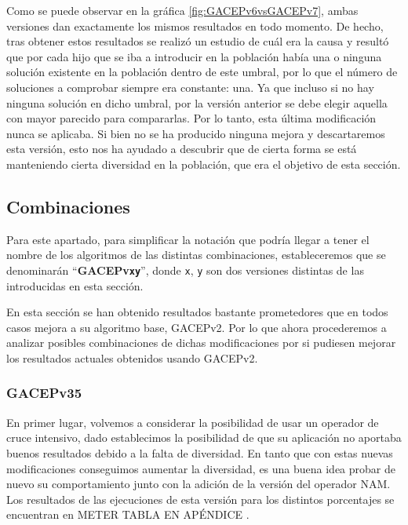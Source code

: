 Como se puede observar en la gráfica \ref{fig:GACEPv6vsGACEPv7}, ambas versiones dan exactamente los mismos resultados en todo momento. 
De hecho, tras obtener estos resultados se realizó un estudio de cuál era la causa y resultó que por cada hijo que se iba a introducir en la población había una o ninguna solución existente en la población dentro de este umbral, por lo que el número de soluciones a comprobar siempre era constante: una. 
Ya que incluso si no hay ninguna solución en dicho umbral, por la versión anterior se debe elegir aquella con mayor parecido para compararlas. 
Por lo tanto, esta última modificación nunca se aplicaba. 
Si bien no se ha producido ninguna mejora y descartaremos esta versión, esto nos ha ayudado a descubrir que de cierta forma se está manteniendo cierta diversidad en la población, que era el objetivo de esta sección. 

\subsection{Combinaciones}

Para este apartado, para simplificar la notación que podría llegar a tener el nombre de los algoritmos de las distintas combinaciones, estableceremos que se denominarán ``\textbf{GACEPv\texttt{xy}}'', donde \texttt{x}, \texttt{y} son dos versiones distintas de las introducidas en esta sección. 

En esta sección se han obtenido resultados bastante prometedores que en todos casos mejora a su algoritmo base, GACEPv2. 
Por lo que ahora procederemos a analizar posibles combinaciones de dichas modificaciones por si pudiesen mejorar los resultados actuales obtenidos usando GACEPv2. 

\subsubsection{GACEPv35}

En primer lugar, volvemos a considerar la posibilidad de usar un operador de cruce intensivo, dado establecimos la posibilidad de que su aplicación no aportaba buenos resultados debido a la falta de diversidad. 
En tanto que con estas nuevas modificaciones conseguimos aumentar la diversidad, es una buena idea probar de nuevo su comportamiento junto con la adición de la versión del operador NAM. 
Los resultados de las ejecuciones de esta versión para los distintos porcentajes se encuentran en \color{red} METER TABLA EN APÉNDICE \color{black}.

